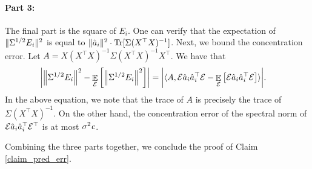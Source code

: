 	\paragraph{Part 3:} The final part is the square of $E_i$. One can verify that the expectation of $\|\Sigma^{1/2} E_i\|^2$ is equal to $\|\hat{a}_i\|^2 \cdot \operatorname{Tr}[\Sigma (X^{\top} X)^{-1}]$.
	Next, we bound the concentration error.
	Let $A = X (X^{\top} X)^{-1} \Sigma (X^{\top} X)^{-1} X^{\top}$.
	We have that
	\begin{align*}
		{\left| {\left\| \Sigma^{1/2} E_i \right\|^2 - \mathop{\mathbb{E}}_{\mathcal{E}}\left[ \left\| \Sigma^{1/2} E_i \right\|^2 \right]} \right|}
		&= {\left| {\langle A, \mathcal{E} \hat{a}_i \hat{a}_i^{\top} \mathcal{E} - \mathop{\mathbb{E}}_{\mathcal{E}}\left[ \mathcal{E} \hat{a}_i \hat{a}_i^{\top} \mathcal{E} \right] \rangle} \right|}.
	\end{align*}
	In the above equation, we note that the trace of $A$ is precisely the trace of $\Sigma (X^{\top} X)^{-1}$.
	On the other hand, the concentration error of the spectral norm of $\mathcal{E} \hat{a}_i \hat{a}_i^{\top} \mathcal{E}^{\top}$ is at most $\sigma^2 {\mathit{c}} $.

	Combining the three parts together, we conclude the proof of Claim \ref{claim_pred_err}.


